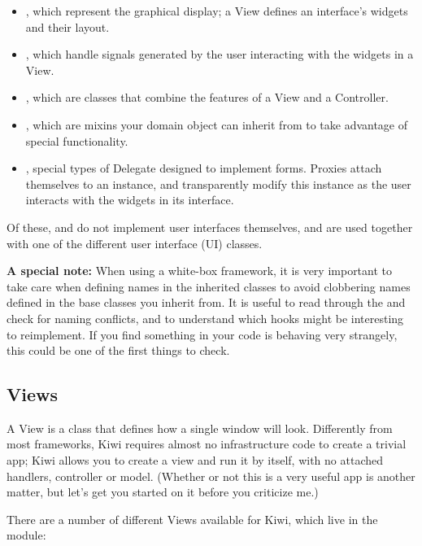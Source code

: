 \documentclass[a4paper]{howto}
\begin{document}
\begin{itemize}
\item {}, which represent the graphical display; a View defines
an interface's widgets and their layout.
\item {}, which handle signals generated by the user
interacting with the widgets in a View.
\item {}, which are classes that combine the features of
a View and a Controller.
\item {}, which are mixins your domain object can
inherit from to take advantage of special functionality.
\item {}, special types of Delegate designed to implement
forms. Proxies attach themselves to an instance, and transparently
modify this instance as the user interacts with the widgets in its
interface.
\end{itemize}

Of these,  and  do not implement user
interfaces themselves, and are used together with one of the different
user interface (UI) classes.

{\bf A special note:} When using a white-box framework, it is very
important to take care when defining names in the inherited classes to
avoid clobbering names defined in the base classes you inherit from. It
is useful to read through the
 and check for naming conflicts, and to understand which
hooks might be interesting to reimplement. If you find something in your
code is behaving very strangely, this could be one of the first things
to check.

\subsection{Views}

A View is a class that defines how a single window will look.
Differently from most frameworks, Kiwi requires almost no infrastructure
code to create a trivial app; Kiwi allows you to create a view and run
it by itself, with no attached handlers, controller or model. (Whether
or not this is a very useful app is another matter, but let's get you
started on it before you criticize me.)

There are a number of different Views available for Kiwi, which live in
the  module:
\end{document}
